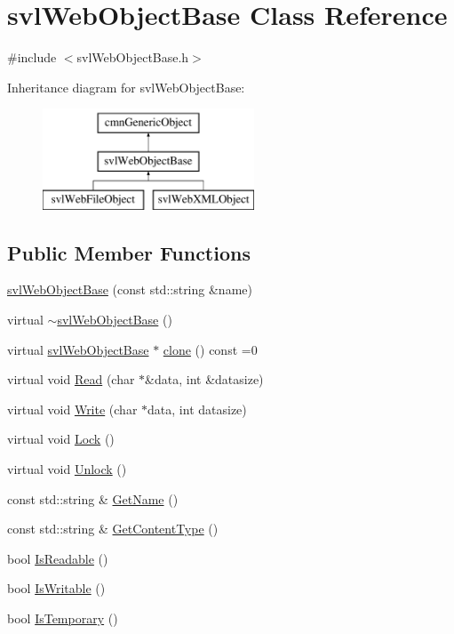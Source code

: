 \hypertarget{classsvl_web_object_base}{}\section{svl\+Web\+Object\+Base Class Reference}
\label{classsvl_web_object_base}


{\ttfamily \#include $<$svl\+Web\+Object\+Base.\+h$>$}

Inheritance diagram for svl\+Web\+Object\+Base\+:\begin{figure}[H]
\begin{center}
\leavevmode
\includegraphics[height=3.000000cm]{de/d57/classsvl_web_object_base}
\end{center}
\end{figure}
\subsection*{Public Member Functions}
\begin{DoxyCompactItemize}
\item 
\hyperlink{classsvl_web_object_base_ae3ba6123950f112821811395f3a42f2e}{svl\+Web\+Object\+Base} (const std\+::string \&name)
\item 
virtual \hyperlink{classsvl_web_object_base_a4fba598ea7687c06b6eb4a77f38eb881}{$\sim$svl\+Web\+Object\+Base} ()
\item 
virtual \hyperlink{classsvl_web_object_base}{svl\+Web\+Object\+Base} $\ast$ \hyperlink{classsvl_web_object_base_a8a9e2f2793eb4584b276fd5cfe3a6f1a}{clone} () const =0
\item 
virtual void \hyperlink{classsvl_web_object_base_a1add3cb5a22e1c3962e56c4bfd278d0b}{Read} (char $\ast$\&data, int \&datasize)
\item 
virtual void \hyperlink{classsvl_web_object_base_aba1bc2e58179cde28f5f9fa1622b8434}{Write} (char $\ast$data, int datasize)
\item 
virtual void \hyperlink{classsvl_web_object_base_a2f317f5884d701cc75dd7b9c876101b0}{Lock} ()
\item 
virtual void \hyperlink{classsvl_web_object_base_afae8d1a4e397b70b0741b537489c9ffc}{Unlock} ()
\item 
const std\+::string \& \hyperlink{classsvl_web_object_base_acbda95cd03202f5d40811efa4077d3ee}{Get\+Name} ()
\item 
const std\+::string \& \hyperlink{classsvl_web_object_base_a79e7485303bf21bc715fd434943b99f7}{Get\+Content\+Type} ()
\item 
bool \hyperlink{classsvl_web_object_base_a14312b9c102e7b37e6b8cb7e03bbd20c}{Is\+Readable} ()
\item 
bool \hyperlink{classsvl_web_object_base_a99ef90dda8e58afaa04a2b90fc86704b}{Is\+Writable} ()
\item 
bool \hyperlink{classsvl_web_object_base_a80f51eaa56004ef934f5185b7e10c93a}{Is\+Temporary} ()
\end{DoxyCompactItemize}
